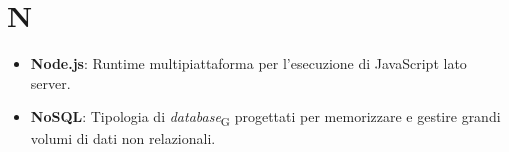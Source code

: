 \section{N}
\begin{itemize}
    \item \textbf{Node.js}: Runtime multipiattaforma per l'esecuzione di JavaScript lato server.
        \item \textbf{NoSQL}: Tipologia di \textit{database}\textsubscript{G} progettati per memorizzare e gestire grandi volumi di dati non relazionali.

\end{itemize}
